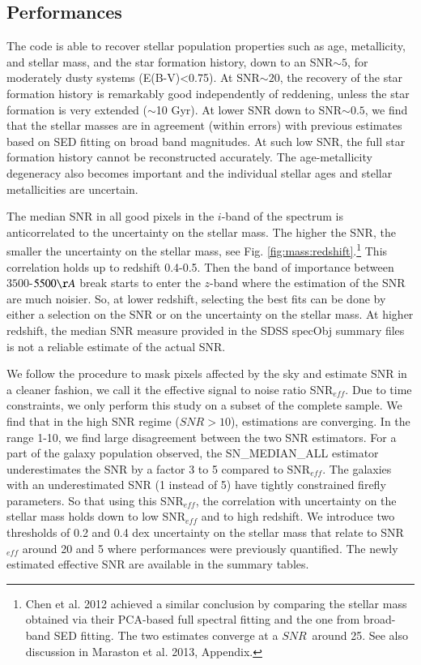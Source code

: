 \documentclass[onecolumn]{aa}
\begin{document}
\subsection{Performances}
\label{subsec:firefly:performances}
The code is able to recover stellar population properties such as age, metallicity, and stellar mass, and the star formation history, 
down to an SNR$\sim5$, for moderately dusty systems (E(B-V)<0.75). 
At SNR$\sim20$, the recovery of the star formation history is remarkably good independently of reddening, unless the star formation is very extended ($\sim$10 Gyr). 
At lower SNR down to SNR$\sim0.5$, we find that the stellar masses are in agreement (within errors) with previous estimates based on SED fitting on broad band magnitudes. 
At such low SNR, the full star formation history cannot be reconstructed accurately. The age-metallicity degeneracy also becomes important and the individual stellar ages and stellar metallicities are uncertain.

The median SNR in all good pixels in the $i$-band of the spectrum is anticorrelated to the uncertainty on the stellar mass. The higher the SNR, the smaller the uncertainty on the stellar mass, see Fig. \ref{fig:mass:redshift}.\footnote{Chen et al. 2012 achieved a similar conclusion by comparing the stellar mass obtained via their PCA-based full spectral fitting and the one from broad-band SED fitting. The two estimates converge at a $SNR$~around 25. See also discussion in Maraston et al. 2013, Appendix.} 
This correlation holds up to redshift 0.4-0.5. 
Then the band of importance between $3500$-$5500\AA$ break starts to enter the $z$-band where the estimation of the SNR are much noisier. 
So, at lower redshift, selecting the best fits can be done by either a selection on the SNR or on the uncertainty on the stellar mass. 
At higher redshift, the median SNR measure provided in the SDSS specObj summary files is not a reliable estimate of the actual SNR. 

We follow the \citet{2013AJ....145...69L} procedure to mask pixels affected by the sky and estimate SNR in a cleaner fashion, we call it the effective signal to noise ratio SNR$_{eff}$. 
Due to time constraints, we only perform this study on a subset of the complete sample. 
We find that in the high SNR regime ($SNR>10$), estimations are converging. 
In the range 1-10, we find large disagreement between the two SNR estimators. 
For a part of the galaxy population observed, the SN\_MEDIAN\_ALL estimator underestimates the SNR by a factor 3 to 5 compared to SNR$_{eff}$. 
The galaxies with an underestimated SNR (1 instead of 5) have tightly constrained firefly parameters. 
So that using this SNR$_{eff}$, the correlation with uncertainty on the stellar mass holds down to low SNR$_{eff}$ and to high redshift. 
We introduce two thresholds of 0.2 and 0.4 dex uncertainty on the stellar mass that relate to SNR$_{eff}$ around 20 and 5 where performances were previously quantified. The newly estimated effective SNR are available in the summary tables.
\end{document}
